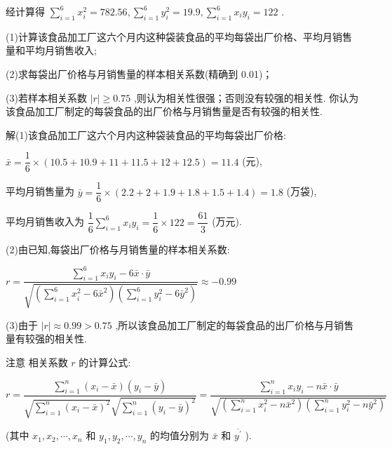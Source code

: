 经计算得 $\mathop{\sum }\limits_{{i = 1}}^{6}{x}_{i}^{2} = {782.56},\mathop{\sum }\limits_{{i = 1}}^{6}{y}_{i}^{2} = {19.9},\mathop{\sum }\limits_{{i = 1}}^{6}{x}_{i}{y}_{i} = {122}$ .

(1)计算该食品加工厂这六个月内这种袋装食品的平均每袋出厂价格、平均月销售量和平均月销售收入;

(2)求每袋出厂价格与月销售量的样本相关系数(精确到 0.01)；

(3)若样本相关系数 $\left| r\right|  \geq  {0.75}$ ,则认为相关性很强；否则没有较强的相关性. 你认为该食品加工厂制定的每袋食品的出厂价格与月销售量是否有较强的相关性.

解(1)该食品加工厂这六个月内这种袋装食品的平均每袋出厂价格:

$\bar{x} = \dfrac{1}{6} \times  \left( {{10.5} + {10.9} + {11} + {11.5} + {12} + {12.5}}\right)  = {11.4}$ (元),

平均月销售量为 $\bar{y} = \dfrac{1}{6} \times  \left( {{2.2} + 2 + {1.9} + {1.8} + {1.5} + {1.4}}\right)  = {1.8}$ (万袋),

平均月销售收入为 $\dfrac{1}{6}\mathop{\sum }\limits_{{i = 1}}^{6}{x}_{i}{y}_{i} = \dfrac{1}{6} \times  {122} = \dfrac{61}{3}$ (万元).

(2)由已知,每袋出厂价格与月销售量的样本相关系数:

$r = \dfrac{\mathop{\sum }\limits_{{i = 1}}^{6}{x}_{i}{y}_{i} - 6\bar{x} \cdot  \bar{y}}{\sqrt{\left( {\mathop{\sum }\limits_{{i = 1}}^{6}{x}_{i}^{2} - 6{\bar{x}}^{2}}\right) \left( {\mathop{\sum }\limits_{{i = 1}}^{6}{y}_{i}^{2} - 6{\bar{y}}^{2}}\right) }} \approx   - {0.99}$

(3)由于 $\left| r\right|  \approx  {0.99} > {0.75}$ ,所以该食品加工厂制定的每袋食品的出厂价格与月销售量有较强的相关性.

注意 相关系数 $r$ 的计算公式:

\[
r = \dfrac{\mathop{\sum }\limits_{{i = 1}}^{n}\left( {{x}_{i} - \bar{x}}\right) \left( {{y}_{i} - \bar{y}}\right) }{\sqrt{\mathop{\sum }\limits_{{i = 1}}^{n}{\left( {x}_{i} - \bar{x}\right) }^{2}}\sqrt{\mathop{\sum }\limits_{{i = 1}}^{n}{\left( {y}_{i} - \bar{y}\right) }^{2}}} = \dfrac{\mathop{\sum }\limits_{{i = 1}}^{n}{x}_{i}{y}_{i} - n\bar{x} \cdot  \bar{y}}{\sqrt{\left( {\mathop{\sum }\limits_{{i = 1}}^{n}{x}_{i}^{2} - n{\bar{x}}^{2}}\right) \left( {\mathop{\sum }\limits_{{i = 1}}^{n}{y}_{i}^{2} - n{\bar{y}}^{2}}\right) }}
\]

(其中 ${x}_{1},{x}_{2},\cdots ,{x}_{n}$ 和 ${y}_{1},{y}_{2},\cdots ,{y}_{n}$ 的均值分别为 $\bar{x}$ 和 $\overline{{y}^{\prime }}$ ).

